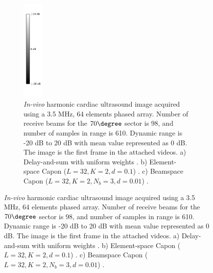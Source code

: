 \begin{figure}[!t]
\begin{figure}[!t]
\centerline{
\hfil
{}
\hfil
{}
\hfil
\includegraphics[width=0.4in]{gfx/colorBarInvivo2.png}
}
\caption{\textit{In-vivo} harmonic cardiac ultrasound image acquired using a 3.5 MHz, 64 elements phased array. Number of receive beams for the $70\degree$ sector is 98, and number of samples in range is 610. Dynamic range is -20 dB to 20 dB with mean value represented as 0 dB. The image is the first frame in the attached videos. a) Delay-and-sum with uniform weights . b) Element-space Capon ($L=32, K=2, d=0.1$) . c) Beamspace Capon ($L=32, K=2, N_b=3, d=0.01$) .}
\label{II_fig:invivo}
\end{figure}


\end{figure}
